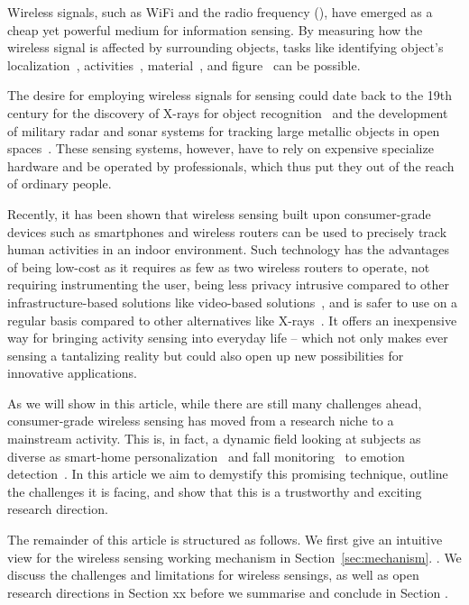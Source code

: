 Wireless signals, such as WiFi and the radio frequency (\RF), have emerged as a cheap yet powerful medium for information sensing. By
measuring how the wireless signal is affected by surrounding objects, tasks like identifying object's localization~\cite{Arraytrack, Tagoram}, activities~\cite{Wang2015Understanding, wang2016human}, material~\cite{Tagscan, LiquID}, and figure~\cite{Tagscan, zhao2018rf} can be possible.


The desire for employing wireless signals for sensing could date back to the 19th century  for the discovery of X-rays for object recognition~\cite{Suzuki1996} and the development of military radar and sonar systems for tracking large metallic objects in open spaces~\cite{Charles Samuel Franklin 's development of first practcial radar}. These sensing systems, however, have to rely on expensive specialize hardware and be operated by professionals, which thus put they out of the reach of ordinary people.


Recently, it has been shown that wireless sensing built upon consumer-grade devices such as smartphones and wireless routers can be used to precisely track human activities in an indoor environment. Such technology has the advantages of being low-cost as it requires as few as
two wireless routers to operate, not requiring instrumenting the user, being less privacy intrusive compared to other infrastructure-based
solutions like video-based solutions~\cite{}, and is safer to use on a regular basis compared to other alternatives like X-rays~\cite{}. It
offers an inexpensive way for bringing activity sensing into everyday life -- which not only makes ever sensing a tantalizing reality but
could also open up new possibilities for innovative applications.


As we will show in this article, while there are still many challenges ahead, consumer-grade wireless sensing has moved from a research
niche to a mainstream activity. This is, in fact, a dynamic field looking at subjects as diverse as smart-home personalization~\cite{} and
fall monitoring~\cite{} to emotion detection~\cite{}. In this article we aim to demystify this promising technique, outline the challenges
it is facing, and show that this is a trustworthy and exciting research direction.




The remainder of this article is structured as follows. We first give an intuitive view for the wireless sensing working mechanism  in
Section~\ref{sec:mechanism}. . We discuss the challenges and limitations for wireless sensings, as
well as open research directions in Section xx before we summarise and conclude in Section .


